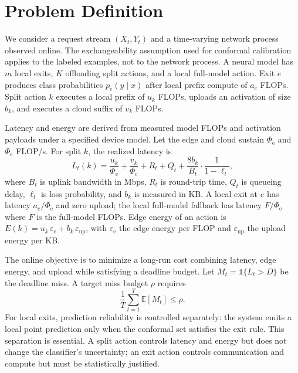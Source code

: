 \documentclass[11pt]{article}
\begin{document}
\section{Problem Definition}

We consider a request stream $(X_t,Y_t)$ and a time-varying network process
observed online. The exchangeability assumption used for conformal calibration
applies to the labeled examples, not to the network process. A neural model has
$m$ local exits, $K$ offloading split actions, and a local full-model action.
Exit $e$ produces class probabilities $p_e(y\mid x)$ after local prefix compute
of $a_e$ FLOPs. Split action $k$ executes a local prefix of $u_k$ FLOPs, uploads
an activation of size $b_k$, and executes a cloud suffix of $v_k$ FLOPs.

Latency and energy are derived from measured model FLOPs and activation payloads
under a specified device model. Let the edge and cloud sustain
$\Phi_{\mathrm{e}}$ and $\Phi_{\mathrm{c}}$ FLOP/s. For split $k$, the realized
latency is
\begin{equation}
    L_t(k) = \frac{u_k}{\Phi_{\mathrm{e}}} + \frac{v_k}{\Phi_{\mathrm{c}}}
    + R_t + Q_t + \frac{8 b_k}{B_t}\cdot\frac{1}{1-\ell_t},
    \label{eq:latency}
\end{equation}
where $B_t$ is uplink bandwidth in Mbps, $R_t$ is round-trip time, $Q_t$ is
queueing delay, $\ell_t$ is loss probability, and $b_k$ is measured in KB. A local
exit at $e$ has latency $a_e/\Phi_{\mathrm{e}}$ and zero upload; the local
full-model fallback has latency $F/\Phi_{\mathrm{e}}$ where $F$ is the full-model
FLOPs. Edge energy of an action is $E(k)=u_k\,\varepsilon_{\mathrm{e}} +
b_k\,\varepsilon_{\mathrm{up}}$, with $\varepsilon_{\mathrm{e}}$ the edge
energy per FLOP and $\varepsilon_{\mathrm{up}}$ the upload energy per KB.

The online objective is to minimize a long-run cost combining latency, edge
energy, and upload while satisfying a deadline budget. Let
$M_t = \mathbb{1}\{L_t > D\}$ be the deadline miss. A target miss budget $\rho$
requires
\begin{equation}
    \frac{1}{T}\sum_{t=1}^{T} \mathbb{E}[M_t] \leq \rho.
\end{equation}
For local exits, prediction reliability is controlled separately: the system
emits a local point prediction only when the conformal set satisfies the exit
rule. This separation is essential. A split action controls latency and energy
but does not change the classifier's uncertainty; an exit action controls
communication and compute but must be statistically justified.
\end{document}
